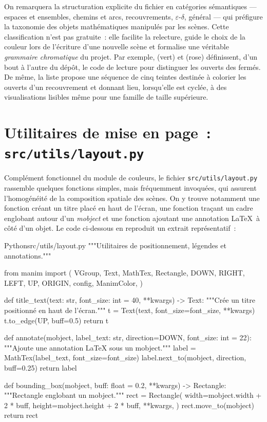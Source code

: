 \documentclass[12pt, a4paper, openany]{report}
\begin{document}
	On remarquera la structuration explicite du fichier en catégories sémantiques — espaces et ensembles, chemins et arcs, recouvrements, $\varepsilon$-$\delta$, général — qui préfigure la taxonomie des objets mathématiques manipulés par les scènes. Cette classification n’est pas gratuite~: elle facilite la relecture, guide le choix de la couleur lors de l’écriture d’une nouvelle scène et formalise une véritable \emph{grammaire chromatique} du projet. Par exemple,  (vert) et  (rose) définissent, d’un bout à l’autre du dépôt, le code de lecture pour distinguer les ouverts des fermés. De même, la liste  propose une séquence de cinq teintes destinée à colorier les ouverts d’un recouvrement et donnant lieu, lorsqu’elle est cyclée, à des visualisations lisibles même pour une famille de taille supérieure.

	\section{Utilitaires de mise en page~: \texttt{src/utils/layout.py}}

	Complément fonctionnel du module de couleurs, le fichier \texttt{src/utils/layout.py} rassemble quelques fonctions simples, mais fréquemment invoquées, qui assurent l’homogénéité de la composition spatiale des scènes. On y trouve notamment une fonction créant un titre placé en haut de l’écran, une fonction traçant un cadre englobant autour d’un \emph{mobject} et une fonction ajoutant une annotation \LaTeX\ à côté d’un objet. Le code ci-dessous en reproduit un extrait représentatif~:

	\begin{codefile}{Python}{src/utils/layout.py}
"""Utilitaires de positionnement, légendes et annotations."""

from manim import (
    VGroup, Text, MathTex, Rectangle, DOWN, RIGHT, LEFT, UP,
    ORIGIN, config, ManimColor,
)


def title_text(text: str, font_size: int = 40, **kwargs) -> Text:
    """Crée un titre positionné en haut de l'écran."""
    t = Text(text, font_size=font_size, **kwargs)
    t.to_edge(UP, buff=0.5)
    return t


def annotate(mobject, label_text: str, direction=DOWN, font_size: int = 22):
    """Ajoute une annotation LaTeX sous un mobject."""
    label = MathTex(label_text, font_size=font_size)
    label.next_to(mobject, direction, buff=0.25)
    return label


def bounding_box(mobject, buff: float = 0.2, **kwargs) -> Rectangle:
    """Rectangle englobant un mobject."""
    rect = Rectangle(
        width=mobject.width + 2 * buff,
        height=mobject.height + 2 * buff,
        **kwargs,
    )
    rect.move_to(mobject)
    return rect
	\end{codefile}
\end{document}
